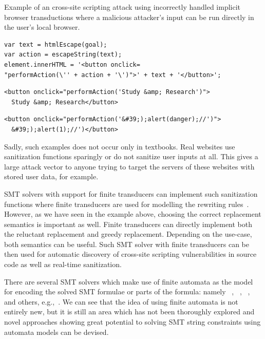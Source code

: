 \begin{listing}[!ht]
\caption{Example of an cross-site scripting attack using incorrectly handled implicit browser transductions where a malicious attacker's input can be run directly in the user's local browser.}
\label{listing:not_sanitized_implicit_browser_transductions_example}

    \begin{verbatim}
var text = htmlEscape(goal);
var action = escapeString(text);
element.innerHTML = '<button onclick=
"performAction(\'' + action + '\')">' + text + '</button>';
    \end{verbatim}

    \begin{verbatim}
<button onclick="performAction('Study &amp; Research')">
  Study &amp; Research</button>
    \end{verbatim}

    \begin{verbatim}
<button onclick="performAction('&#39;);alert(danger);//')">
  &#39;);alert(1);//')</button>
    \end{verbatim}
\end{listing}

Sadly, such examples does not occur only in textbooks. Real websites use sanitization functions sparingly or do not sanitize user inputs at all.
This gives a large attack vector to anyone trying to target the servers of these websites with stored user data, for example.

SMT solvers with support for finite transducers can implement such sanitization functions where finite transducers are used for modelling the rewriting rules~\cite{rewriting_rules_kaplan94, rewriting_rules_karttunen97}.
However, as we have seen in the example above, choosing the correct replacement semantics is important as well.
Finite transducers can directly implement both the reluctant replacement and greedy replacement.
Depending on the use-case, both semantics can be useful.
Such SMT solver with finite transducers can be then used for automatic discovery of cross-site scripting vulnerabilities in source code as well as real-time sanitization.

There are several SMT solvers which make use of finite automata as the model for encoding the solved SMT formulae or parts of the formula: namely \ziiistriiire~\cite{Z3str3RE}, \trau~\cite{Trau}, \norn~\cite{Norn}, and others, e.g.,~\cite{AnthonyComplex2019}.
We can see that the idea of using finite automata is not entirely new, but it is still an area which has not been thoroughly explored and novel approaches showing great potential to solving SMT string constraints using automata models can be devised.

